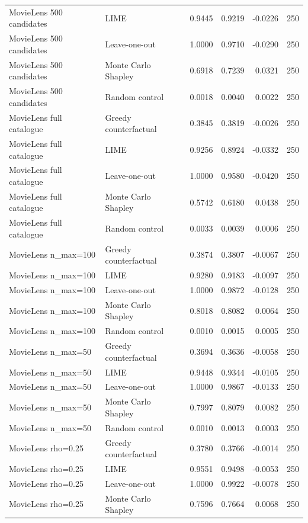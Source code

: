 \begin{longtable}{@{}p{}p{}rrrr@{}}
MovieLens 500 candidates & LIME & 0.9445 & 0.9219 & -0.0226 & 250 \\
MovieLens 500 candidates & Leave-one-out & 1.0000 & 0.9710 & -0.0290 & 250 \\
MovieLens 500 candidates & Monte Carlo Shapley & 0.6918 & 0.7239 & 0.0321 & 250 \\
MovieLens 500 candidates & Random control & 0.0018 & 0.0040 & 0.0022 & 250 \\
MovieLens full catalogue & Greedy counterfactual & 0.3845 & 0.3819 & -0.0026 & 250 \\
MovieLens full catalogue & LIME & 0.9256 & 0.8924 & -0.0332 & 250 \\
MovieLens full catalogue & Leave-one-out & 1.0000 & 0.9580 & -0.0420 & 250 \\
MovieLens full catalogue & Monte Carlo Shapley & 0.5742 & 0.6180 & 0.0438 & 250 \\
MovieLens full catalogue & Random control & 0.0033 & 0.0039 & 0.0006 & 250 \\
MovieLens n\_max=100 & Greedy counterfactual & 0.3874 & 0.3807 & -0.0067 & 250 \\
MovieLens n\_max=100 & LIME & 0.9280 & 0.9183 & -0.0097 & 250 \\
MovieLens n\_max=100 & Leave-one-out & 1.0000 & 0.9872 & -0.0128 & 250 \\
MovieLens n\_max=100 & Monte Carlo Shapley & 0.8018 & 0.8082 & 0.0064 & 250 \\
MovieLens n\_max=100 & Random control & 0.0010 & 0.0015 & 0.0005 & 250 \\
MovieLens n\_max=50 & Greedy counterfactual & 0.3694 & 0.3636 & -0.0058 & 250 \\
MovieLens n\_max=50 & LIME & 0.9448 & 0.9344 & -0.0105 & 250 \\
MovieLens n\_max=50 & Leave-one-out & 1.0000 & 0.9867 & -0.0133 & 250 \\
MovieLens n\_max=50 & Monte Carlo Shapley & 0.7997 & 0.8079 & 0.0082 & 250 \\
MovieLens n\_max=50 & Random control & 0.0010 & 0.0013 & 0.0003 & 250 \\
MovieLens rho=0.25 & Greedy counterfactual & 0.3780 & 0.3766 & -0.0014 & 250 \\
MovieLens rho=0.25 & LIME & 0.9551 & 0.9498 & -0.0053 & 250 \\
MovieLens rho=0.25 & Leave-one-out & 1.0000 & 0.9922 & -0.0078 & 250 \\
MovieLens rho=0.25 & Monte Carlo Shapley & 0.7596 & 0.7664 & 0.0068 & 250 \\

\end{longtable}
